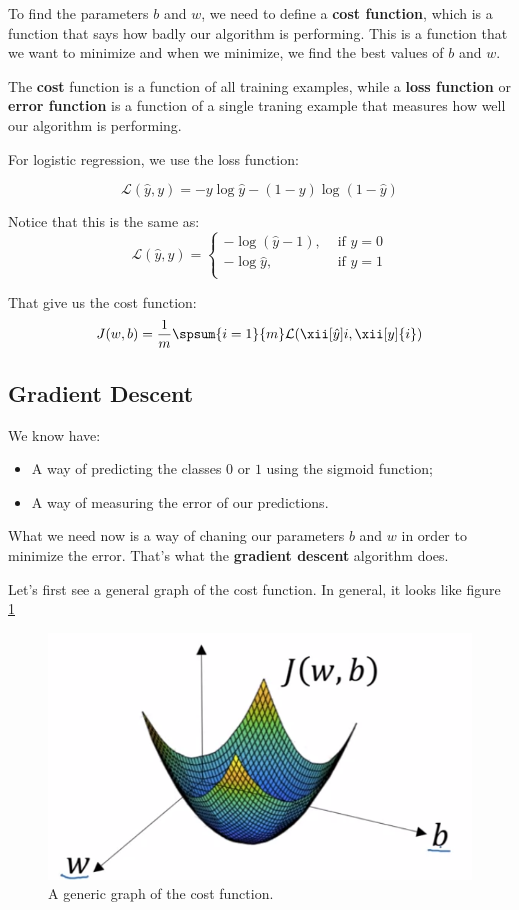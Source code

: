 \documentclass[12pt, a4paper, oneside]{book}
\begin{document}
To find the parameters $b$ and $w$, we need to define a \textbf{cost function},
which is a function that says how badly our algorithm is performing. This is a
function that we want to minimize and when we minimize, we find the best values
of $b$ and $w$.

The \textbf{cost} function is a function of all training examples, while a
\textbf{loss function} or \textbf{error function} is a function of a single
traning example that measures how well our algorithm is performing.

For logistic regression, we use the loss function:

\[
    \mathcal{L}(\hat{y},y)=-y \log\hat{y}-(1-y)\log(1-\hat{y})
\]

Notice that this is the same as:
\[
    \mathcal{L}(\hat{y},y)=\begin{cases}
        -\log(\hat{y}-1), &\text{ if } y=0\\
        -\log\hat{y}, &\text{ if } y=1\\
    \end{cases}
\]

That give us the cost function:
\[
    J(w,b)=\dfrac{1}{m}\spsum{i=1}{m}\mathcal{L}(\xii[\hat{y}]{i},\xii[y]{i})
\]

\subsection{Gradient Descent}%
\label{sub:gradient_descent}

We know have:
\begin{itemize}
    \item A way of predicting the classes $0$ or $1$ using the sigmoid function;
    \item A way of measuring the error of our predictions.
\end{itemize}

What we need now is a way of chaning our parameters $b$ and $w$ in order to
minimize the error. That's what the \textbf{gradient descent} algorithm does.

Let's first see a general graph of the cost function. In general, it looks like
figure \ref{Cost_function.png}

\begin{figure}[h]
\centering
\includegraphics[scale=0.8]{Res/Cost_function.png}
\caption{A generic graph of the cost function.}
\label{Cost_function.png}
\end{figure}
\end{document}
